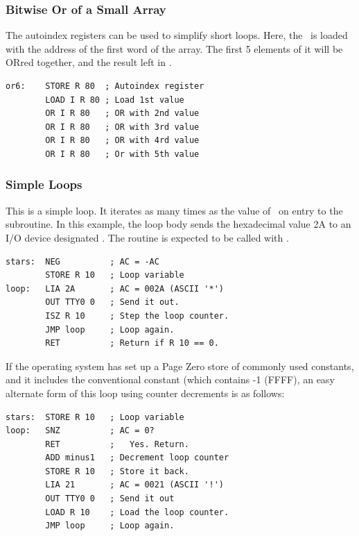 \subsubsection{Bitwise Or of a Small Array}

The autoindex registers can be used to simplify short loops. Here, the
\A\ is loaded with the address of the first word of the array. The
first 5 elements of it will be ORred together, and the result left in
\A.

\begin{lstlisting}[language=cftasm]
or6:    STORE R 80  ; Autoindex register
        LOAD I R 80 ; Load 1st value
        OR I R 80   ; OR with 2nd value
        OR I R 80   ; OR with 3rd value
        OR I R 80   ; OR with 4rd value
        OR I R 80   ; Or with 5th value
\end{lstlisting}

\subsubsection{Simple Loops}

This is a simple loop. It iterates as many times as the value of
\A\ on entry to the subroutine. In this example, the loop body sends
the hexadecimal value {\ttfamily 2A} to an I/O device designated . The routine is expected to be called with .

\begin{lstlisting}[language=cftasm]
stars:  NEG          ; AC = -AC
        STORE R 10   ; Loop variable
loop:   LIA 2A       ; AC = 002A (ASCII '*')
        OUT TTY0 0   ; Send it out.
        ISZ R 10     ; Step the loop counter.
        JMP loop     ; Loop again.
        RET          ; Return if R 10 == 0.
\end{lstlisting}

If the operating system has set up a Page Zero store of commonly used
constants, and it includes the conventional constant  (which
contains -1 ({\ttfamily FFFF}), an easy alternate form of this loop using
counter decrements is as follows:

\begin{lstlisting}[language=cftasm]
stars:  STORE R 10   ; Loop variable
loop:   SNZ          ; AC = 0?
        RET          ;   Yes. Return.
        ADD minus1   ; Decrement loop counter
        STORE R 10   ; Store it back.
        LIA 21       ; AC = 0021 (ASCII '!')
        OUT TTY0 0   ; Send it out
        LOAD R 10    ; Load the loop counter.
        JMP loop     ; Loop again.
\end{lstlisting}

